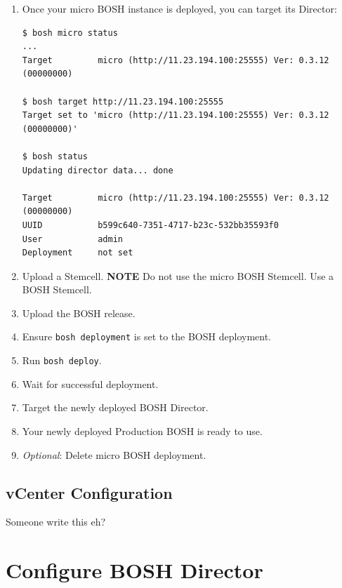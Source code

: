 \begin{enumerate}
\item Once your micro BOSH instance is deployed, you can target its Director:

\begin{verbatim}
$ bosh micro status
...
Target         micro (http://11.23.194.100:25555) Ver: 0.3.12 (00000000)

$ bosh target http://11.23.194.100:25555
Target set to 'micro (http://11.23.194.100:25555) Ver: 0.3.12 (00000000)'

$ bosh status
Updating director data... done

Target         micro (http://11.23.194.100:25555) Ver: 0.3.12 (00000000)
UUID           b599c640-7351-4717-b23c-532bb35593f0
User           admin
Deployment     not set
\end{verbatim}


\item Upload a Stemcell. \textbf{NOTE} Do not use the micro BOSH Stemcell. Use a BOSH Stemcell.

\item Upload the BOSH release.

\item Ensure \texttt{bosh deployment} is set to the BOSH deployment.

\item Run \texttt{bosh deploy}.

\item Wait for successful deployment.

\item Target the newly deployed BOSH Director.

\item Your newly deployed Production BOSH is ready to use.

\item \emph{Optional}: Delete micro BOSH deployment.

\end{enumerate}

\section{vCenter Configuration}
\label{vcenterconfiguration}

Someone write this eh?

\chapter{Configure BOSH Director}
\label{configureboshdirector}

